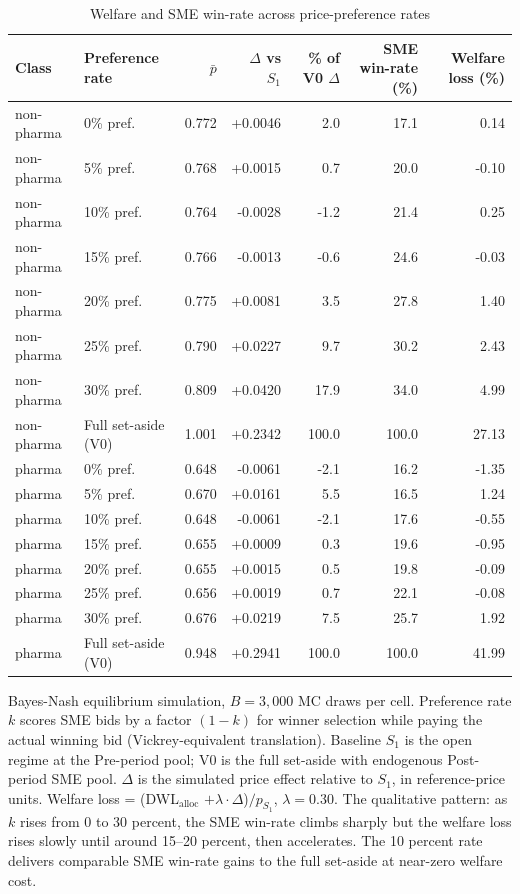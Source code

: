 \begin{table}[!htbp]
\centering
\small
\caption{Welfare and SME win-rate across price-preference rates}
\label{tab:v3_preference_grid}
\begin{threeparttable}
\begin{tabular}{llrrrrr}
\toprule
Class & Preference rate & $\bar p$ & $\Delta$ vs $S_1$ & \% of V0 $\Delta$ & SME win-rate (\%) & Welfare loss (\%) \\
\midrule
non-pharma & 0\% pref. & 0.772 & +0.0046 & 2.0 & 17.1 & 0.14 \\
non-pharma & 5\% pref. & 0.768 & +0.0015 & 0.7 & 20.0 & -0.10 \\
non-pharma & 10\% pref. & 0.764 & -0.0028 & -1.2 & 21.4 & 0.25 \\
non-pharma & 15\% pref. & 0.766 & -0.0013 & -0.6 & 24.6 & -0.03 \\
non-pharma & 20\% pref. & 0.775 & +0.0081 & 3.5 & 27.8 & 1.40 \\
non-pharma & 25\% pref. & 0.790 & +0.0227 & 9.7 & 30.2 & 2.43 \\
non-pharma & 30\% pref. & 0.809 & +0.0420 & 17.9 & 34.0 & 4.99 \\
non-pharma & Full set-aside (V0) & 1.001 & +0.2342 & 100.0 & 100.0 & 27.13 \\
pharma & 0\% pref. & 0.648 & -0.0061 & -2.1 & 16.2 & -1.35 \\
pharma & 5\% pref. & 0.670 & +0.0161 & 5.5 & 16.5 & 1.24 \\
pharma & 10\% pref. & 0.648 & -0.0061 & -2.1 & 17.6 & -0.55 \\
pharma & 15\% pref. & 0.655 & +0.0009 & 0.3 & 19.6 & -0.95 \\
pharma & 20\% pref. & 0.655 & +0.0015 & 0.5 & 19.8 & -0.09 \\
pharma & 25\% pref. & 0.656 & +0.0019 & 0.7 & 22.1 & -0.08 \\
pharma & 30\% pref. & 0.676 & +0.0219 & 7.5 & 25.7 & 1.92 \\
pharma & Full set-aside (V0) & 0.948 & +0.2941 & 100.0 & 100.0 & 41.99 \\
\bottomrule
\end{tabular}
\begin{tablenotes}\footnotesize
\item Bayes-Nash equilibrium simulation, $B = 3{,}000$ MC draws per cell.
Preference rate $k$ scores SME bids by a factor $(1-k)$ for winner
selection while paying the actual winning bid (Vickrey-equivalent
translation). Baseline $S_1$ is the open regime at the Pre-period
pool; V0 is the full set-aside with endogenous Post-period SME pool.
$\Delta$ is the simulated price effect relative to $S_1$, in
reference-price units. Welfare loss = (DWL$_{\text{alloc}}$
$+ \lambda \cdot \Delta$)$/p_{S_1}$, $\lambda = 0.30$. The
qualitative pattern: as $k$ rises from 0 to 30 percent, the SME
win-rate climbs sharply but the welfare loss rises slowly until
around 15--20 percent, then accelerates. The 10 percent rate
delivers comparable SME win-rate gains to the full set-aside at
near-zero welfare cost.
\end{tablenotes}
\end{threeparttable}
\end{table}
